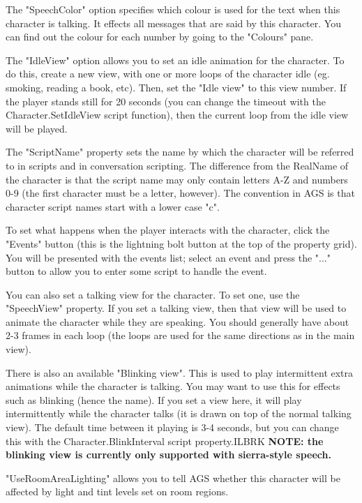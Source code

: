 The "SpeechColor" option specifies which colour is used for the text when
this character is talking. It effects all messages that are said by this
character. You can find out the colour for each number by going
to the "Colours" pane.

The "IdleView" option allows you to set an idle animation for the character.
To do this, create a new view, with one or more loops of the character idle
(eg. smoking, reading a book, etc). Then, set the "Idle view" to this view number.
If the player stands still for 20 seconds (you can change the timeout with
the Character.SetIdleView script function), then the current loop
from the idle view will be played.

The "ScriptName" property sets the name by which the character will be
referred to in scripts and in conversation scripting.
The difference from the RealName of the character is that the script name
may only contain letters A-Z and numbers 0-9 (the first character must be
a letter, however). The convention in AGS is that character script names
start with a lower case "c".

To set what happens when the player interacts with the character, click the
"Events" button (this is the lightning bolt button at the top of the property
grid). You will be presented with the events list; select an event and
press the "..." button to allow you to enter some script to handle the event.

You can also set a talking view for the character. To set one, use the
"SpeechView" property. If you set a talking view, then that view will be
used to animate the character while they are speaking. You should generally
have about 2-3 frames in each loop (the loops are used for
the same directions as in the main view).

There is also an available "Blinking view". This is used to play intermittent extra
animations while the character is talking. You may want to use this for effects
such as blinking (hence the name).  If you set a view here, it will play intermittently
while the character talks (it is drawn on top of the normal talking view). The default
time between it playing is 3-4 seconds, but you can change this with the Character.BlinkInterval
script property.ILBRK
\bf{NOTE}: the blinking view is currently only supported with sierra-style speech.

"UseRoomAreaLighting" allows you to tell AGS whether this character will be
affected by light and tint levels set on room regions.

